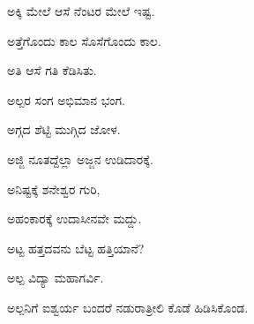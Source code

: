 
\noindent\hspace*{0.6em}\kbvbullet\hspace{0.55em}ಅಕ್ಕಿ ಮೇಲೆ ಆಸೆ ನೆಂಟರ ಮೇಲೆ ಇಷ್ಟ.\par

\noindent\hspace*{0.6em}\kbvbullet\hspace{0.55em}ಅತ್ತೆಗೊಂದು ಕಾಲ ಸೊಸೆಗೊಂದು ಕಾಲ.\par

\noindent\hspace*{0.6em}\kbvbullet\hspace{0.55em}ಅತಿ ಆಸೆ ಗತಿ ಕೆಡಿಸಿತು.\par

\noindent\hspace*{0.6em}\kbvbullet\hspace{0.55em}ಅಲ್ಪರ ಸಂಗ ಅಭಿಮಾನ ಭಂಗ.\par

\noindent\hspace*{0.6em}\kbvbullet\hspace{0.55em}ಅಗ್ಗದ ಶೆಟ್ಟಿ ಮುಗ್ಗಿದ ಜೋಳ.\par

\noindent\hspace*{0.6em}\kbvbullet\hspace{0.55em}ಅಜ್ಜಿ ನೂತದ್ದೆಲ್ಲಾ ಅಜ್ಜನ ಉಡಿದಾರಕ್ಕೆ.\par

\noindent\hspace*{0.6em}\kbvbullet\hspace{0.55em}ಅನಿಷ್ಟಕ್ಕೆ ಶನೇಶ್ವರ ಗುರಿ,\par

\noindent\hspace*{0.6em}\kbvbullet\hspace{0.55em}ಅಹಂಕಾರಕ್ಕೆ ಉದಾಸೀನವೇ ಮದ್ದು.\par

\noindent\hspace*{0.6em}\kbvbullet\hspace{0.55em}ಅಟ್ಟ ಹತ್ತದವನು ಬೆಟ್ಟ ಹತ್ತಿಯಾನೆ?\par

\noindent\hspace*{0.6em}\kbvbullet\hspace{0.55em}ಅಲ್ಪ ವಿದ್ಯಾ ಮಹಾಗರ್ವಿ.\par

\noindent\hspace*{0.6em}\kbvbullet\hspace{0.55em}ಅಲ್ಪನಿಗೆ ಐಶ್ವರ್ಯ ಬಂದರೆ ನಡುರಾತ್ರೀಲಿ ಕೊಡೆ ಹಿಡಿಸಿಕೊಂಡ.\par

